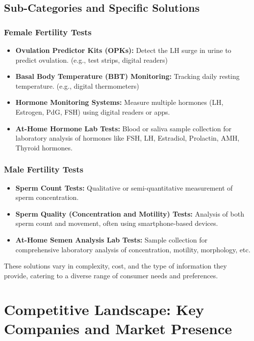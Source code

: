 \documentclass{article}
\begin{document}
\subsection{Sub-Categories and Specific Solutions}
\subsubsection{Female Fertility Tests}
\begin{itemize}
    \item \textbf{Ovulation Predictor Kits (OPKs):} Detect the LH surge in urine to predict ovulation. (e.g., test strips, digital readers)
    \item \textbf{Basal Body Temperature (BBT) Monitoring:} Tracking daily resting temperature. (e.g., digital thermometers)
    \item \textbf{Hormone Monitoring Systems:} Measure multiple hormones (LH, Estrogen, PdG, FSH) using digital readers or apps.
    \item \textbf{At-Home Hormone Lab Tests:} Blood or saliva sample collection for laboratory analysis of hormones like FSH, LH, Estradiol, Prolactin, AMH, Thyroid hormones.
\end{itemize}
\subsubsection{Male Fertility Tests}
\begin{itemize}
    \item \textbf{Sperm Count Tests:} Qualitative or semi-quantitative measurement of sperm concentration.
    \item \textbf{Sperm Quality (Concentration and Motility) Tests:} Analysis of both sperm count and movement, often using smartphone-based devices.
    \item \textbf{At-Home Semen Analysis Lab Tests:} Sample collection for comprehensive laboratory analysis of concentration, motility, morphology, etc.
\end{itemize}
These solutions vary in complexity, cost, and the type of information they provide, catering to a diverse range of consumer needs and preferences.

\section{Competitive Landscape: Key Companies and Market Presence}
\end{document}

